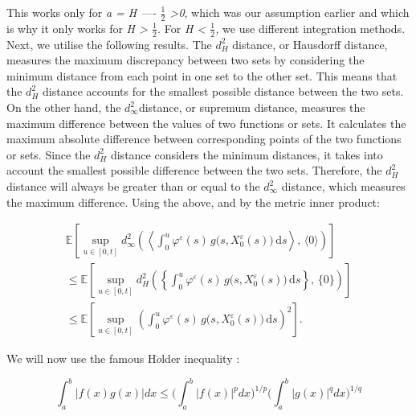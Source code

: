 \documentclass[12pt,a4paper]{report}
\numberwithin{equation}{section}
\begin{document}
This works only for \emph{a = H ---- $\frac{1}{2}$ \textgreater0}, which was our
assumption earlier and which is why it only works for \emph{H
\textgreater{} $\frac{1}{2}$.} For \emph{H \textless{} $\frac{1}{2}$,} we use different
integration methods. Next, we utilise the following results. The
\(d_{H}^{2}\) distance, or Hausdorff distance, measures the maximum
discrepancy between two sets by considering the minimum distance from
each point in one set to the other set. This means that the
\(d_{H}^{2}\) distance accounts for the smallest possible distance
between the two sets. On the other hand, the \(d_{\infty}^{2}\)distance,
or supremum distance, measures the maximum difference between the values
of two functions or sets. It calculates the maximum absolute difference
between corresponding points of the two functions or sets. Since the
\(d_{H}^{2}\) distance considers the minimum distances, it takes into
account the smallest possible difference between the two sets.
Therefore, the \(d_{H}^{2}\ \)distance will always be greater than or
equal to the \(d_{\infty}^{2}\) distance, which measures the maximum
difference. Using the above, and by the metric inner product:

\begin{equation}\tag{5.1.13}\label{eq:5.1.13}
\begin{gathered}
\mathbb{E}\!\left[\sup_{u\in[0,t]}
d_{\infty}^{2}\!\left(
\left\langle \int_{0}^{u}\varphi^{\varepsilon}(s)\,
g\bigl(s,X_{0}^{\varepsilon}(s)\bigr)\,\mathrm{d}s \right\rangle,\,
\langle 0\rangle
\right)\right] \\[2pt]
\le \mathbb{E}\!\left[\sup_{u\in[0,t]}
d_{H}^{2}\!\left(
\left\{\int_{0}^{u}\varphi^{\varepsilon}(s)\,
g\bigl(s,X_{0}^{\varepsilon}(s)\bigr)\,\mathrm{d}s\right\},\,
\{0\}
\right)\right] \\[2pt]
\le \mathbb{E}\!\left[\sup_{u\in[0,t]}
\left(\int_{0}^{u}\varphi^{\varepsilon}(s)\,
g\bigl(s,X_{0}^{\varepsilon}(s)\bigr)\,\mathrm{d}s\right)^{2}\right].
\end{gathered}
\end{equation}


We will now use the famous H\(\ddot{o}\)lder inequality \cite{young1936inequality_77}:

\[\int_{a}^{b}{|f(x)g(x)|dx \leq (\int_{a}^{b}{|f(x)|^{p}dx)^{1/p}(\int_{a}^{b}{|g(x)|^{q}dx)^{1/q}}}}\]
\end{document}
